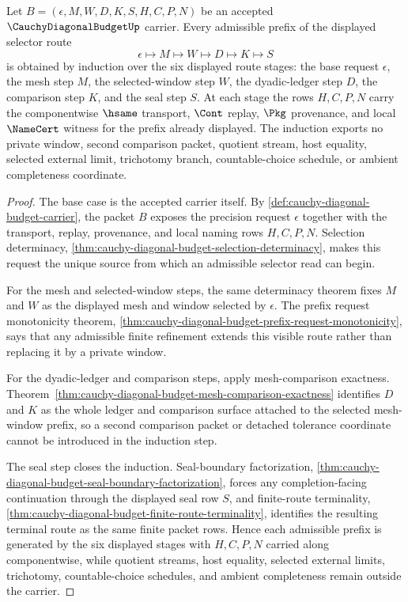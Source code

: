 \begin{theorem}
\label{thm:cauchy-diagonal-budget-finite-route-induction}
Let $B=(\epsilon,M,W,D,K,S,H,C,P,N)$ be an accepted $\CauchyDiagonalBudgetUp$ carrier. Every admissible prefix of the displayed selector route
$$
\epsilon \longmapsto M \longmapsto W \longmapsto D \longmapsto K \longmapsto S
$$
is obtained by induction over the six displayed route stages: the base request $\epsilon$, the mesh step $M$, the selected-window step $W$, the dyadic-ledger step $D$, the comparison step $K$, and the seal step $S$. At each stage the rows $H,C,P,N$ carry the componentwise $\hsame$ transport, $\Cont$ replay, $\Pkg$ provenance, and local $\NameCert$ witness for the prefix already displayed. The induction exports no private window, second comparison packet, quotient stream, host equality, selected external limit, trichotomy branch, countable-choice schedule, or ambient completeness coordinate.
\end{theorem}
\begin{proof}
The base case is the accepted carrier itself. By \autoref{def:cauchy-diagonal-budget-carrier}, the packet $B$ exposes the precision request $\epsilon$ together with the transport, replay, provenance, and local naming rows $H,C,P,N$. Selection determinacy, \autoref{thm:cauchy-diagonal-budget-selection-determinacy}, makes this request the unique source from which an admissible selector read can begin.

For the mesh and selected-window steps, the same determinacy theorem fixes $M$ and $W$ as the displayed mesh and window selected by $\epsilon$. The prefix request monotonicity theorem, \autoref{thm:cauchy-diagonal-budget-prefix-request-monotonicity}, says that any admissible finite refinement extends this visible route rather than replacing it by a private window.

For the dyadic-ledger and comparison steps, apply mesh-comparison exactness. Theorem~\ref{thm:cauchy-diagonal-budget-mesh-comparison-exactness} identifies $D$ and $K$ as the whole ledger and comparison surface attached to the selected mesh-window prefix, so a second comparison packet or detached tolerance coordinate cannot be introduced in the induction step.

The seal step closes the induction. Seal-boundary factorization, \autoref{thm:cauchy-diagonal-budget-seal-boundary-factorization}, forces any completion-facing continuation through the displayed seal row $S$, and finite-route terminality, \autoref{thm:cauchy-diagonal-budget-finite-route-terminality}, identifies the resulting terminal route as the same finite packet rows. Hence each admissible prefix is generated by the six displayed stages with $H,C,P,N$ carried along componentwise, while quotient streams, host equality, selected external limits, trichotomy, countable-choice schedules, and ambient completeness remain outside the carrier.
\end{proof}

